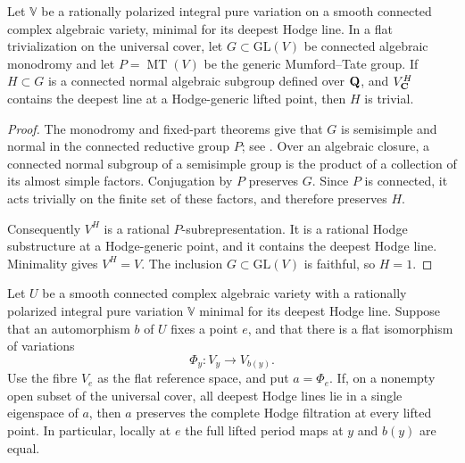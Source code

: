 \begin{lemma}
\label{altord:p:normality}
Let $\mathbb V$ be a rationally polarized integral pure variation on a smooth
connected complex algebraic variety, minimal for its deepest Hodge line.
In a flat trivialization on the universal cover, let $G\subset\mathrm{GL}(V)$
be connected algebraic monodromy and let $P=\operatorname{MT}(V)$ be the generic
Mumford--Tate group.  If $H\subset G$ is a connected normal algebraic
subgroup defined over $\mathbf Q$, and $V^H_{\mathbf C}$ contains the deepest line at a
Hodge-generic lifted point, then $H$ is trivial.
\end{lemma}

\begin{proof}
The monodromy and fixed-part theorems give that $G$ is semisimple and
normal in the connected reductive group $P$; see
\cite[\S5, Theorem~1 and Corollary~1]{AndreMonodromy}.  Over an
algebraic closure, a connected normal subgroup of a semisimple group is
the product of a collection of its almost simple factors.  Conjugation
by $P$ preserves $G$.  Since $P$ is connected, it acts trivially on the
finite set of these factors, and therefore preserves $H$.

Consequently $V^H$ is a rational $P$-subrepresentation.  It is a rational
Hodge substructure at a Hodge-generic point, and it contains the deepest
Hodge line.  Minimality gives $V^H=V$.  The inclusion
$G\subset\mathrm{GL}(V)$ is faithful, so $H=1$.
\end{proof}

\begin{lemma}
\label{altord:p:inertia}
Let $U$ be a smooth connected complex algebraic variety with a rationally
polarized integral pure variation $\mathbb V$ minimal for its deepest Hodge line.
Suppose that an automorphism $b$ of $U$ fixes a point $e$, and that there
is a flat isomorphism of variations
\[
  \Phi_y:V_y\longrightarrow V_{b(y)}.
\]
Use the fibre $V_e$ as the flat reference space, and put $a=\Phi_e$.
If, on a nonempty open subset of the universal cover, all deepest Hodge
lines lie in a single eigenspace of $a$, then $a$ preserves the complete
Hodge filtration at every lifted point.  In particular, locally at $e$
the full lifted period maps at $y$ and $b(y)$ are equal.
\end{lemma}

